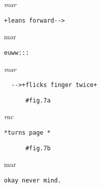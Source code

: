 \documentclass[output=paper,nonflat,modfont,draft]{langsci/langscibook}
\begin{document}
\newpage
{}


\begin{transbox}{2}{\textit{mar}}
\begin{verbatim}
+leans forward-->
\end{verbatim}
\end{transbox}

\begin{transbox}{3}{mar}
\begin{verbatim}
euww:::
\end{verbatim}
\end{transbox}


\begin{mdframedkendrick}[style=firstfoc]
\begin{transbox}{5}{\textit{mar}}
\begin{verbatim}
  -->+flicks finger twice+
\end{verbatim}
\end{transbox}
\end{mdframedkendrick}\vspace{-5mm}

\begin{transbox}{6}{\fig}
\begin{verbatim}
      #fig.7a
\end{verbatim}
\end{transbox}


\begin{mdframedkendrick}[style=secondfoc]
\begin{transbox}{8}{\textit{rac}}
\begin{verbatim}
*turns page *
\end{verbatim}
\end{transbox}
\end{mdframedkendrick}\vspace{-5mm}

\begin{transbox}{9}{\fig}
\begin{verbatim}
      #fig.7b
\end{verbatim}
\end{transbox}


\begin{transbox}{9}{mar}
\begin{verbatim}
okay never mind.
\end{verbatim}
\end{transbox}
\end{document}
